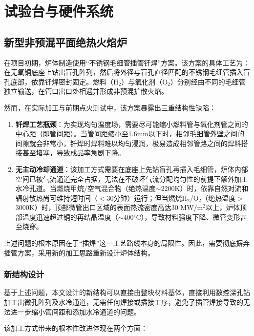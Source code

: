 
\chapter{试验台与硬件系统}


\section{新型非预混平面绝热火焰炉}

在项目初期，炉体制造使用“不锈钢毛细管插管钎焊”方案。该方案的具体工艺为：在无氧铜底座上钻出盲孔阵列，然后将外径与盲孔直径匹配的不锈钢毛细管插入盲孔底部，依靠钎焊密封固定。燃料（H$_2$）与氧化剂（O$_2$）分别经由不同的毛细管独立输送，在管口出口处相遇并形成非预混扩散火焰。

然而，在实际加工与前期点火测试中，该方案暴露出三重结构性缺陷：

\begin{enumerate}
	\item \textbf{钎焊工艺瓶颈}：为实现均匀温度场，需要尽可能缩小燃料管与氧化剂管之间的中心距（即管间距）。当管间距缩小至1.6mm以下时，相邻毛细管外壁之间的间隙就会非常小，钎焊时焊料难以均匀浸润，极易造成相邻管路之间的焊料搭接甚至堵塞，导致成品率急剧下降。
	\item \textbf{无主动冷却通道}：该加工方式需要在底座上先钻盲孔再插入毛细管，炉体内部空间已被气流通道完全占据，无法在不破坏气流分配均匀性的前提下额外加工水冷孔道。当燃烧甲烷/空气混合物（绝热温度$\sim$2200K）时，依靠自然对流和辐射散热尚可维持短时间（$<$30分钟）运行；但当燃烧H$_2$/O$_2$（绝热温度$>$3000K）时，顶部微管出口区域的表面热流密度高达30 MW/m$^2$以上，炉体顶部温度迅速超过铜的再结晶温度（$\sim$400$^\circ$C），导致材料强度下降、微管变形甚至烧穿。
\end{enumerate}

上述问题的根本原因在于“插焊”这一工艺路线本身的局限性。因此，需要彻底摒弃插管方案，采用新的加工思路重新设计炉体结构。

\subsection{新结构设计}

基于上述问题，本文设计的新结构可以直接由整块材料基体，直接利用数控深孔钻加工出微孔阵列及水冷通道，无需任何焊接或插接工序，避免了插管焊接导致的无法进一步缩小管间距和添加水冷通道的问题。

该加工方式带来的根本性改进体现在两个方面：

